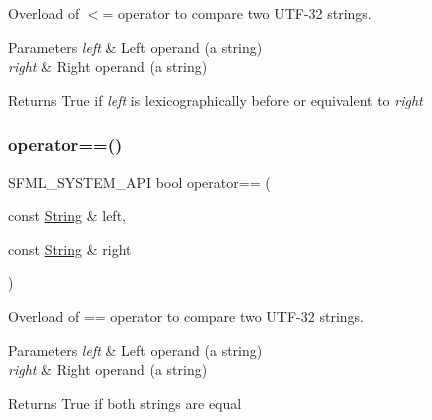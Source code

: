 Overload of $<$= operator to compare two U\+T\+F-\/32 strings. 


\begin{DoxyParams}{Parameters}
{\em left} & Left operand (a string) \\
\hline
{\em right} & Right operand (a string)\\
\hline
\end{DoxyParams}
\begin{DoxyReturn}{Returns}
True if {\itshape left} is lexicographically before or equivalent to {\itshape right} \begin{DoxyVerb}\end{DoxyVerb}
 
\end{DoxyReturn}
\mbox{\label{classsf_1_1_string_a2a385459fa9a237e61a712fa956d489e}} 
\subsubsection{\texorpdfstring{operator==()}{operator==()}}
{\footnotesize\ttfamily S\+F\+M\+L\+\_\+\+S\+Y\+S\+T\+E\+M\+\_\+\+A\+PI bool operator== (\begin{DoxyParamCaption}\item[{const \mbox{\hyperlink{classsf_1_1_string}{String}} \&}]{left,  }\item[{const \mbox{\hyperlink{classsf_1_1_string}{String}} \&}]{right }\end{DoxyParamCaption})\hspace{0.3cm}{\ttfamily [related]}}



Overload of == operator to compare two U\+T\+F-\/32 strings. 


\begin{DoxyParams}{Parameters}
{\em left} & Left operand (a string) \\
\hline
{\em right} & Right operand (a string)\\
\hline
\end{DoxyParams}
\begin{DoxyReturn}{Returns}
True if both strings are equal \begin{DoxyVerb}\end{DoxyVerb}
 
\end{DoxyReturn}
\mbox{\label{classsf_1_1_string_a5efc1eca58cf5c17d01eb8501d303538}} 
